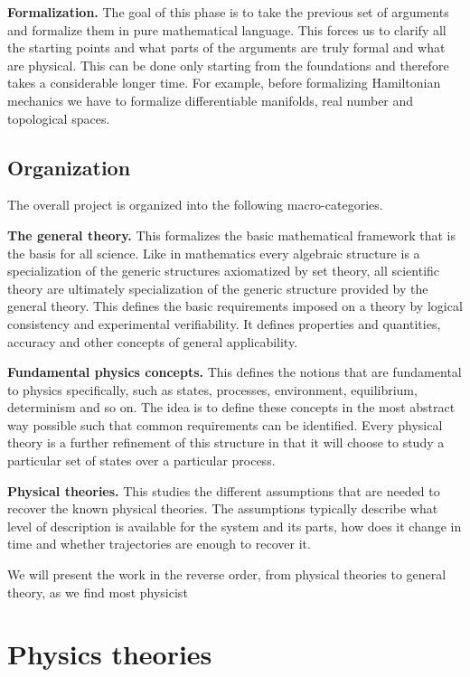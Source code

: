 \documentclass[twocolumn]{article}
\begin{document}
\textbf{Formalization.} The goal of this phase is to take the previous set of arguments and formalize them in pure mathematical language. This forces us to clarify all the starting points and what parts of the arguments are truly formal and what are physical. This can be done only starting from the foundations and therefore takes a considerable longer time. For example, before formalizing Hamiltonian mechanics we have to formalize differentiable manifolds, real number and topological spaces.

\subsection{Organization}

The overall project is organized into the following macro-categories.

\textbf{The general theory.} This formalizes the basic mathematical framework that is the basis for all science. Like in mathematics every algebraic structure is a specialization of the generic structures axiomatized by set theory, all scientific theory are ultimately specialization of the generic structure provided by the general theory. This defines the basic requirements imposed on a theory by logical consistency and experimental verifiability. It defines properties and quantities, accuracy and other concepts of general applicability.

\textbf{Fundamental physics concepts.} This defines the notions that are fundamental to physics specifically, such as states, processes, environment, equilibrium, determinism and so on. The idea is to define these concepts in the most abstract way possible such that common requirements can be identified. Every physical theory is a further refinement of this structure in that it will choose to study a particular set of states over a particular process.

\textbf{Physical theories.} This studies the different assumptions that are needed to recover the known physical theories. The assumptions typically describe what level of description is available for the system and its parts, how does it change in time and whether trajectories are enough to recover it.

We will present the work in the reverse order, from physical theories to general theory, as we find most physicist 

\section{Physics theories}
\end{document}
